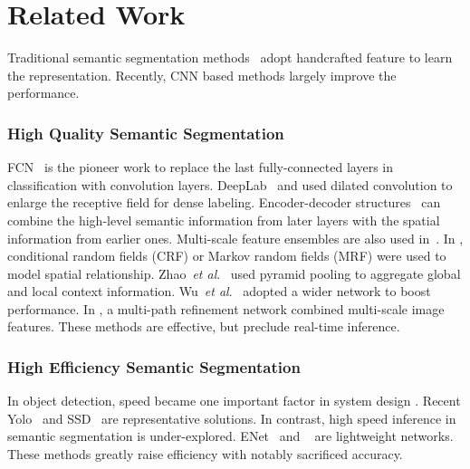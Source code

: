 \documentclass[runningheads]{llncs}
\newcommand{\etal}{\textit{et al}.}
\begin{document}
\section{Related Work}
Traditional semantic segmentation methods~\cite{liu2011nonparametric} adopt handcrafted feature to learn the representation. Recently, CNN based methods largely improve the performance.

\subsubsection{High Quality Semantic Segmentation}
FCN~\cite{long2015fully} is the pioneer work to replace the last fully-connected layers in classification with convolution layers. DeepLab~\cite{chen2015semantic,chen2016deeplab} and \cite{yu2016multi} used dilated convolution to enlarge the receptive field for dense labeling. Encoder-decoder structures~\cite{badrinarayanan2015segnet,noh2015learning} can combine the high-level semantic information from later layers with the spatial information from earlier ones. Multi-scale feature ensembles are also used in~\cite{chen2015attention,hariharan2015hypercolumns,xia2016zoom}. In \cite{chen2015semantic,liu2015semantic,zheng2015conditional}, conditional random fields (CRF) or Markov random fields (MRF) were used to model spatial relationship. Zhao~\etal~\cite{zhao2017pspnet} used pyramid pooling to aggregate global and local context information. Wu~\etal~\cite{wu2016wider} adopted a wider network to boost performance. In \cite{lin2017refine}, a multi-path refinement network combined multi-scale image features. These methods are effective, but preclude real-time inference.

\subsubsection{High Efficiency Semantic Segmentation}
In object detection, speed became one important factor in system design \cite{girshick2015fastrcnn,ren2015faster}. Recent Yolo~\cite{Redmon2016yolo,Redmon2017yolo2} and SSD~\cite{liu2016ssd} are representative solutions. In contrast, high speed inference in semantic segmentation is under-explored.
ENet~\cite{paszke2016enet} and ~\cite{romera2017efficient} are lightweight networks. These methods greatly raise efficiency with notably sacrificed accuracy.
\end{document}
